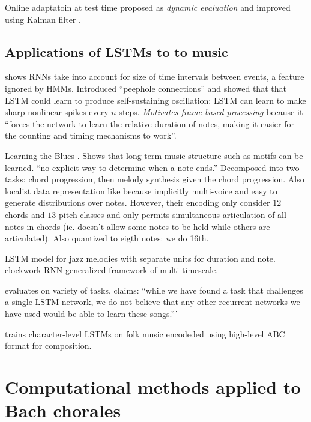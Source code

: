 \documentclass[dissertation.tex]{subfiles}
\begin{document}
Online adaptatoin at test time proposed as \emph{dynamic evaluation}
\cite{Mikolov2010} \cite{Mikolov2012} and improved using Kalman filter
\cite{gers2002dekf}.

\subsection{Applications of LSTMs to to music}

\cite{gers2000recurrent}\cite{gers2002learning} shows RNNs take into account
for size of time intervals between events, a feature ignored by HMMs.
Introduced ``peephole connections'' and showed that that LSTM could learn to
produce self-sustaining oscillation: LSTM can learn to make sharp nonlinear
spikes every $n$ steps. \emph{Motivates frame-based processing} because it ``forces
the network to learn the relative duration of notes, making it easier for the
counting and timing mechanisms to work''\cite{Eck2002}.

Learning the Blues \cite{Eck2002} \cite{Eck2002-blues}. Shows that long term
music structure such as motifs can be learned. ``no explicit way to determine
when a note ends.'' Decomposed into two tasks: chord progression, then melody synthesis
given the chord progression. Also localist data representation like
\cite{todd1989connectionist} because implicitly multi-voice and easy to
generate distributions over notes. However, their encoding only consider $12$
chords and $13$ pitch classes and only permits simultaneous articulation of all
notes in chords (ie. doesn't allow some notes to be held while others are
articulated). Also quantized to eigth notes: we do 16th.

LSTM model for jazz melodies with separate units for duration and note\cite{franklin2005jazz}.
\cite{Koutnik2014} clockwork RNN generalized framework of multi-timescale.

\cite{franklin2006recurrent} evaluates on variety of tasks, claims: ``while we have found a task
that challenges a single LSTM network, we do not believe that any other recurrent networks we have used
would be able to learn these songs.'''

\cite{sturm2015folk} \cite{sturm2016music} trains character-level LSTMs on folk
music encodeded using high-level ABC format for composition.

\section{Computational methods applied to Bach chorales}
\end{document}
